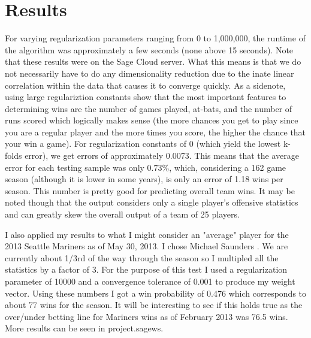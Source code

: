\documentclass{article}
\begin{document}
\section{Results}
\label{Results}
For varying regularization parameters ranging from 0 to 1,000,000, the runtime of the algorithm was approximately a few seconds (none above 15 seconds). Note that these results were on the Sage Cloud server. What this means is that we do not necessarily have to do any dimensionality reduction due to the inate linear correlation within the data that causes it to converge quickly. As a sidenote, using large regulariztion constants show that the most important features to determining wins are the number of games played, at-bats, and the number of runs scored which logically makes sense (the more chances you get to play since you are a regular player and the more times you score, the higher the chance that your win a game). For regularization constants of 0 (which yield the lowest k-folds error), we get errors of approximately 0.0073. This means that the average error for each testing sample was only 0.73\%, which, considering a 162 game season (although it is lower in some years), is only an error of 1.18 wins per season. This number is pretty good for predicting overall team wins. It may be noted though that the output considers only a single player's offensive statistics and can greatly skew the overall output of a team of 25 players.

\parindent I also applied my results to what I might consider an "average" player for the 2013 Seattle Mariners as of May 30, 2013. I chose Michael Saunders \cite{bbref}. We are currently about 1/3rd of the way through the season so I multipled all the statistics by a factor of 3. For the purpose of this test I used a regularization parameter of 10000 and a convergence tolerance of 0.001 to produce my weight vector. Using these numbers I got a win probability of 0.476 which corresponds to about 77 wins for the season. It will be interesting to see if this holds true as the over/under betting line for Mariners wins as of February 2013 was 76.5 wins. More results can be seen in project.sagews.
\end{document}
